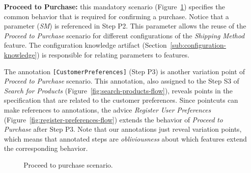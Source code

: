 \documentclass{sig-alt-full}
\begin{document}
{\bf Proceed to Purchase:} this mandatory scenario
(Figure~\ref{fig:proceed-to-checkout}) specifies the common behavior that is
required for confirming a purchase. Notice that a parameter (\emph{SM}) is referenced in Step P2. 
This parameter allows the reuse of the \emph{Proceed to
Purchase} scenario for different configurations of the \emph{Shipping Method} feature. The configuration 
knowledge artifact (Section~\ref{sub:configuration-knowledge}) is responsible for relating parameters to features.

The annotation \mbox{\texttt{[CustomerPreferences]}} (Step P3) is
another variation point of \emph{Proceed to Purchase} scenario. This annotation, also assigned to the Step S3 of \emph{Search for Products} (Figure~\ref{fig:search-products-flow}), reveals points in the specification that are related to the customer preferences. Since pointcuts can make references to annotations, the advice \emph{Register User Preferences} (Figure~\ref{fig:register-preferences-flow}) extends the behavior of \emph{Proceed to Purchase} after Step P3. Note that our annotations just reveal variation points, which means that annotated steps are \emph{obliviousness} about which features extend the corresponding behavior. 

\begin{figure}[h]
\caption{Proceed to purchase scenario.}
\label{fig:proceed-to-checkout}
\end{figure}
\end{document}
